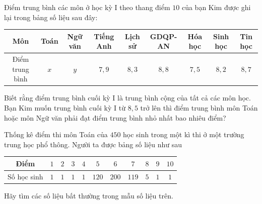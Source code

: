 \begin{bt}%
	Điểm trung bình các môn ở học kỳ I theo thang điểm $10$ của bạn Kim được ghi lại trong bảng số liệu sau đây:
	\begin{center}
		\begin{tabular}{|c|c|c|c|c|c|c|c|c|}
			\hline
			Môn&Toán  &Ngữ văn  &Tiếng Anh  &Lịch sử  &GDQP-AN  &Hóa học  &Sinh học  &Tin học  \\
			\hline
			Điểm trung bình&$x$  &$y$  &$7{,}9$  &$8{,}3$  &$8{,}8$  &$7{,}5$  &$8{,}2$  &$8{,}7$ \\
			\hline
		\end{tabular}
	\end{center}
	Biết rằng điểm trung bình cuối kỳ I là trung bình cộng của tất cả các môn học. Bạn Kim muốn trung bình cuối kỳ I từ $8{,}5$ trở lên thì điểm trung bình môn Toán hoặc môn Ngữ văn phải đạt điểm trung bình nhỏ nhất bao nhiêu điểm?
	
\end{bt}

\begin{bt}%
	Thống kê điểm thi môn Toán của $450$ học sinh trong một kì thi ở một trường trung học phổ thông. Người ta được bảng số liệu như sau
	\begin{center}
		\begin{tabular}{|c|c|c|c|c|c|c|c|c|c|c|}
			\hline
			Điểm             &	$1$   & $2$  & $3$  & $4$  & $5$   & $6$ & $7$  & $8$  & $9$  & $10$   \\  	\hline
			Số học sinh  &   $1$ & $1$ & $1$ & $1$ & $120$ & $200$ & $119$ & $5$ & $1$ & $1$  \\  	\hline
		\end{tabular} 
	\end{center}
	Hãy tìm các số liệu bất thường trong mẫu số liệu trên.
\end{bt}

